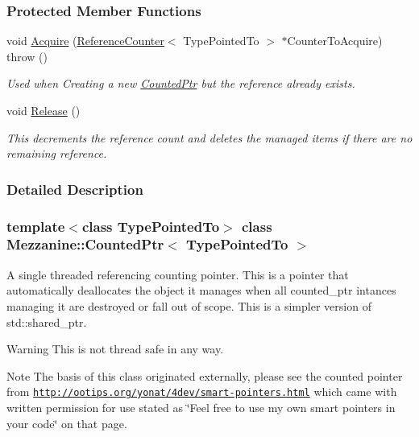 \subsubsection*{Protected Member Functions}
\begin{DoxyCompactItemize}
\item 
void \hyperlink{classMezzanine_1_1CountedPtr_aa236cd0fffaeab68d49ac6855bcbee17}{Acquire} (\hyperlink{structMezzanine_1_1ReferenceCounter}{ReferenceCounter}$<$ TypePointedTo $>$ $\ast$CounterToAcquire)  throw ()
\begin{DoxyCompactList}\small\item\em Used when Creating a new \hyperlink{classMezzanine_1_1CountedPtr}{CountedPtr} but the reference already exists. \item\end{DoxyCompactList}\item 
\hypertarget{classMezzanine_1_1CountedPtr_aedb1e5da381fcbf10c7737d4383fb715}{
void \hyperlink{classMezzanine_1_1CountedPtr_aedb1e5da381fcbf10c7737d4383fb715}{Release} ()}
\label{classMezzanine_1_1CountedPtr_aedb1e5da381fcbf10c7737d4383fb715}

\begin{DoxyCompactList}\small\item\em This decrements the reference count and deletes the managed items if there are no remaining reference. \item\end{DoxyCompactList}\end{DoxyCompactItemize}


\subsubsection{Detailed Description}
\subsubsection*{template$<$class TypePointedTo$>$ class Mezzanine::CountedPtr$<$ TypePointedTo $>$}

A single threaded referencing counting pointer. This is a pointer that automatically deallocates the object it manages when all counted\_\-ptr intances managing it are destroyed or fall out of scope. This is a simpler version of std::shared\_\-ptr. \begin{DoxyWarning}{Warning}
This is not thread safe in any way. 
\end{DoxyWarning}
\begin{DoxyNote}{Note}
The basis of this class originated externally, please see the counted pointer from \href{http://ootips.org/yonat/4dev/smart-pointers.html}{\tt http://ootips.org/yonat/4dev/smart-\/pointers.html} which came with written permission for use stated as \char`\"{}Feel free to use my own smart pointers in your code\char`\"{} on that page. 
\end{DoxyNote}


